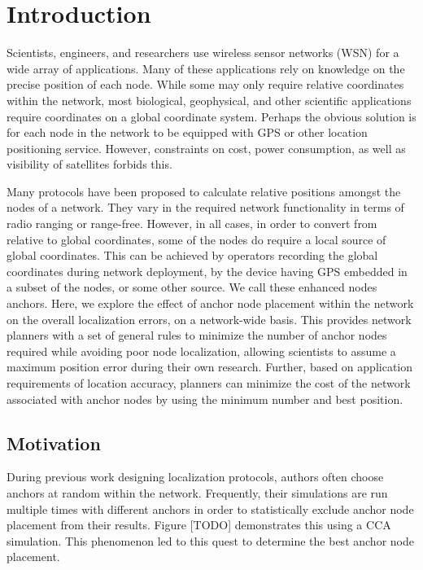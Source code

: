 \chapter{Introduction}

Scientists, engineers, and researchers use wireless sensor networks (WSN) for a wide array of applications. Many of these applications rely on knowledge on the precise position of each node. While some may only require relative coordinates within the network, most biological, geophysical, and other scientific applications require coordinates on a global coordinate system. Perhaps the obvious solution is for each node in the network to be equipped with GPS or other location positioning service.  However, constraints on cost, power consumption, as well as visibility of satellites forbids this.  

Many protocols have been proposed\cite{DV-HOP,MDS-MAP,CCA-MAP07} to calculate relative positions amongst the nodes of a network.  They vary in the required network functionality in terms of radio ranging or range-free.  However, in all cases, in order to convert from relative to global coordinates, some of the nodes do require a local source of global coordinates.  This can be achieved by operators recording the global coordinates during network deployment, by the device having GPS embedded in a subset of the nodes, or some other source.  We call these enhanced nodes anchors.  Here, we explore the effect of anchor node placement within the network on the overall localization errors, on a network-wide basis. This provides network planners with a set of general rules to minimize the number of anchor nodes required while avoiding poor node localization, allowing scientists to assume a maximum position error during their own research.  Further, based on application requirements of location accuracy, planners can minimize the cost of the network associated with anchor nodes by using the minimum number and best position.

\section{Motivation} 
During previous work designing localization protocols\cite[p. 11]{CCA-MAP09}, authors often choose anchors at random within the network.  Frequently, their simulations are run multiple times with different anchors in order to statistically exclude anchor node placement from their results. Figure [TODO] demonstrates this using a CCA simulation.  This phenomenon led to this quest to determine the best anchor node placement.

